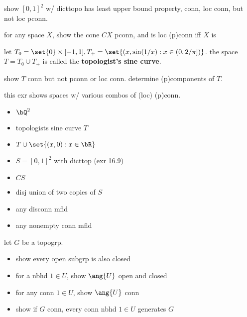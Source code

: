 \begin{exr}[source=Primary Source Material]
    show $[0,1]^{2}$ w/ dicttopo has least upper bound property, conn, loc conn,
    but not loc pconn.
\end{exr}

\begin{exr}[source=Primary Source Material]
    for any space $X$, show the cone $CX$ pconn, and is loc (p)conn iff $X$ is
\end{exr}

\begin{exr}[source=Primary Source Material]
    let $T_{0}=\set{0}\times[-1,1], T_{+}=\set{(x,\sin(1/x):x\in(0,2/\pi])}$.
    the space $T=T_{0}\cup T_{+}$ is called the \textbf{topologist's sine curve}.

    show $T$ conn but not pconn or loc conn.
    determine (p)components of $T$.
\end{exr}

\begin{exr}[source=Primary Source Material]
    this exr shows spaces w/ various combos of (loc) (p)conn.
    \begin{itemize}[nosep,itemsep=.5pt]
        \item $\bQ^{2}$
        \item topologists sine curve $T$
        \item $T\cup\set{(x,0):x\in\bR}$
        \item $S=[0,1]^{2}$ with dicttop (exr 16.9)
        \item $CS$
        \item disj union of two copies of $S$
        \item any disconn mfld
        \item any nonempty conn mfld
    \end{itemize}
\end{exr}

\newpage
\begin{exr}[source=Primary Source Material]
    let $G$ be a topogrp.
    \begin{itemize}
        \item show every open subgrp is also closed
        \item for a nbhd $1\in U$, show $\ang{U}$ open and closed
        \item for any conn $1\in U$, show $\ang{U}$ conn
        \item show if $G$ conn, every conn nbhd $1\in U$ generates $G$
    \end{itemize}
\end{exr}

